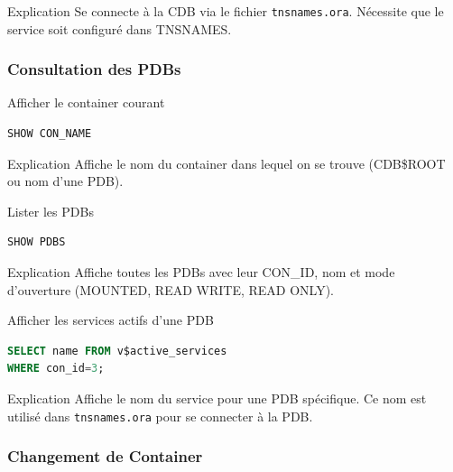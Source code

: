 \documentclass[12pt,a4paper]{article}
\begin{document}
\begin{explication}{Explication}
Se connecte à la CDB via le fichier \texttt{tnsnames.ora}. Nécessite que le service soit configuré dans TNSNAMES.
\end{explication}

\subsubsection{Consultation des PDBs}

\begin{commande}{Afficher le container courant}
\begin{lstlisting}[language=SQL]
SHOW CON_NAME
\end{lstlisting}
\end{commande}

\begin{explication}{Explication}
Affiche le nom du container dans lequel on se trouve (CDB\$ROOT ou nom d'une PDB).
\end{explication}

\begin{commande}{Lister les PDBs}
\begin{lstlisting}[language=SQL]
SHOW PDBS
\end{lstlisting}
\end{commande}

\begin{explication}{Explication}
Affiche toutes les PDBs avec leur CON\_ID, nom et mode d'ouverture (MOUNTED, READ WRITE, READ ONLY).
\end{explication}

\begin{commande}{Afficher les services actifs d'une PDB}
\begin{lstlisting}[language=SQL]
SELECT name FROM v$active_services 
WHERE con_id=3;
\end{lstlisting}
\end{commande}

\begin{explication}{Explication}
Affiche le nom du service pour une PDB spécifique. Ce nom est utilisé dans \texttt{tnsnames.ora} pour se connecter à la PDB.
\end{explication}

\subsubsection{Changement de Container}
\end{document}

